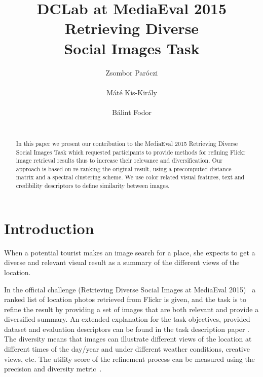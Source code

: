 \documentclass{acm_proc_article-me}
\begin{document}

\title{DCLab at MediaEval 2015 Retrieving Diverse \\ Social Images Task}


\author{
\alignauthor
Zsombor Par\'oczi\\
       \\
\alignauthor
M\'at\'e Kis-Kir\'aly \\
		\\
\alignauthor
B\'alint Fodor\\
		\\
}

\maketitle
\begin{abstract}
In this paper we present our contribution to the MediaEval 2015 Retrieving Diverse Social Images Task which requested participants to provide methods for refining Flickr image retrieval results thus to increase their relevance and diversification. Our approach is based on re-ranking the original result, using a precomputed distance matrix and a spectral clustering scheme. We use color related visual features, text and credibility descriptors to define similarity between images.
\end{abstract}

\section{Introduction}

When a potential tourist makes an image search for a place, she expects to get a diverse and relevant visual result as a summary of the different views of the location. 

In the official challenge (Retrieving Diverse Social Images at MediaEval 2015)~\cite{Task2015} a ranked list of location photos retrieved from Flickr is given, and the task is to refine the result by providing a set of images that are both relevant and provide a diversified summary. An extended explanation for the task objectives, provided dataset and evaluation descriptors can be found in the task description paper \cite{Task2015}. The diversity means that images can illustrate different views of the location at different times of the day/year and under different weather conditions, creative views, etc. The utility score of the refinement process can be measured using the precision and diversity metric~\cite{Taneva2010}. 
\end{document}
